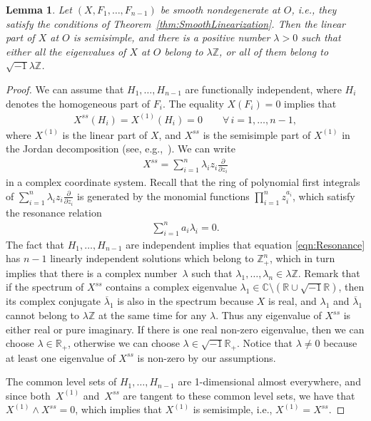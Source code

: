 \documentclass[pdftex]{sigma}
\numberwithin{equation}{section}
\newtheorem{lem}[thm]{Lemma}
\newcommand{\bbR}{\mathbb R}
\newcommand{\bbC}{\mathbb C}
\newcommand{\bbZ}{\mathbb Z}
\begin{document}
\begin{lem} \label{lem:HypOrEl}
 Let $(X,F_1,\dots,F_{n-1})$ be smooth nondegenerate at $O$, i.e., they satisfy the conditions of Theorem~{\rm \ref{thm:SmoothLinearization}}.
Then the linear part of $X$ at $O$ is semisimple, and there is a positive number $\lambda > 0$ such that either all the eigenvalues of $X$ at $O$ belong to $\lambda \bbZ$, or all of them belong to $\sqrt{-1} \lambda \bbZ$.
\end{lem}

\begin{proof} We can assume that $H_1,\dots,H_{n-1}$ are functionally independent, where $H_i$ denotes the homogeneous part
of $F_i$. The equality $X(F_i) = 0$ implies that
\begin{gather*}
 X^{ss}(H_i) = X^{(1)}(H_i) = 0 \qquad \forall \, i=1,\dots,n-1,
\end{gather*}
where $X^{(1)}$ is the linear part of $X$, and $X^{ss}$ is the semisimple part of $X^{(1)}$ in the Jordan decomposition
(see, e.g.,~\cite{Zung-Poincare2002,Zung-Nondegenerate2015}). We can write
\begin{gather*}
 X^{ss} = \sum_{i=1}^n \lambda_i z_i \frac{\partial}{\partial z_i}
\end{gather*}
in a complex coordinate system. Recall that the ring of polynomial f\/irst integrals of $\sum\limits_{i=1}^n \lambda_i z_i \frac{\partial}{\partial z_i}$ is generated by the monomial functions $\prod\limits_{i=1}^n z_i^{a_i}$, which satisfy the resonance relation
\begin{gather} \label{eqn:Resonance}
 \sum_{i=1}^n a_i \lambda_i = 0.
\end{gather}
The fact that $H_1,\dots, H_{n-1}$ are independent implies that equation \eqref{eqn:Resonance} has $n-1$ linearly
independent solutions which belong to $\bbZ^n_+$, which in turn implies that there is a complex number~$\lambda$ such that $\lambda_1,\dots, \lambda_n \in \lambda \bbZ$. Remark that if the spectrum of $X^{ss}$ contains
a complex eigenvalue $\lambda_1 \in \bbC \setminus (\bbR \cup \sqrt{-1}\bbR)$, then its complex conjugate $\overline \lambda_1$
is also in the spectrum because $X$ is real, and $\lambda_1$ and $\overline \lambda_1$ cannot belong to $\lambda\bbZ$
at the same time for any $\lambda$. Thus any eigenvalue of $X^{ss}$ is either real or pure imaginary. If there is one real
non-zero eigenvalue, then we can choose $\lambda \in \bbR_+$, otherwise we can choose $\lambda \in \sqrt{-1}\bbR_+$.
Notice that $\lambda \neq 0$ because at least one eigenvalue of $X^{ss}$ is non-zero by our assumptions.

The common level sets of $H_1, \dots, H_{n-1}$ are 1-dimensional almost everywhere, and since both~$X^{(1)}$
and~$X^{ss}$ are tangent to these common level sets, we have that $X^{(1)} \wedge X^{ss} = 0$, which implies that
$X^{(1)}$ is semisimple, i.e., $X^{(1)} = X^{ss}$.
\end{proof}
\end{document}
